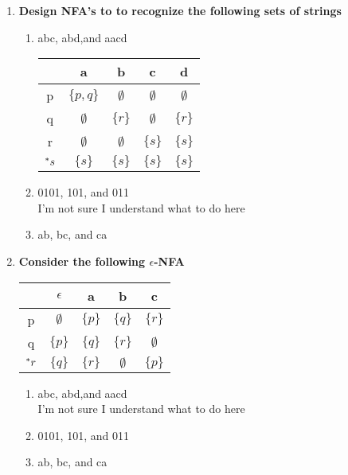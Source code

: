 \begin{enumerate}
\begin{enumerate}
	\item \textbf{Design NFA's to to recognize the following sets of strings}
		\begin{enumerate}
			\item abc, abd,and aacd 
				\begin{table}[H]
				\centering
				\begin{tabular}{c||c|c|c|c}
					&  a &  b & c & d \\ \hline
					p& $\{p,q\}$ &  $\emptyset$ & $\emptyset$ & $\emptyset$   \\ \hline
					q&  $\emptyset$ & $\{r\}$& $\emptyset$ &  $\{r\}$   \\ \hline
					r&  $\emptyset$&  $\emptyset$ & $\{s\}$& $\{s\}$  \\ \hline
					${}^\ast s$& $\{s\}$ & $\{s\}$ & $\{s\}$ & $\{s\}$ \\ \hline
				\end{tabular}
			\end{table}
		
			\item 0101, 101, and 011
			\\ I'm not sure I understand what to do here
			\item ab, bc, and ca 
		\end{enumerate}

	\item \textbf{Consider the following $\epsilon$-NFA}

		\begin{table}[H]
				\centering
		\begin{tabular}{c||c|c|c|c}
			&  $\epsilon$ &  a   & b & c\\ \hline
			p&  $\emptyset$ &  $\{p\}$  & $\{q\}$& $\{r\}$ \\ \hline
			q&  $\{p\}$& $\{q\}$   & $\{r\}$ &  $\emptyset$\\ \hline
			${}^\ast r$&  $\{q\}$& $\{r\}$ &  $\emptyset$ & $\{p\}$ \\ \hline
		\end{tabular}
	\end{table}

			\begin{enumerate}
		\item abc, abd,and aacd 
					\\ I'm not sure I understand what to do here
		\item 0101, 101, and 011
		\item ab, bc, and ca 
	\end{enumerate}
\end{enumerate}

\end{enumerate}


